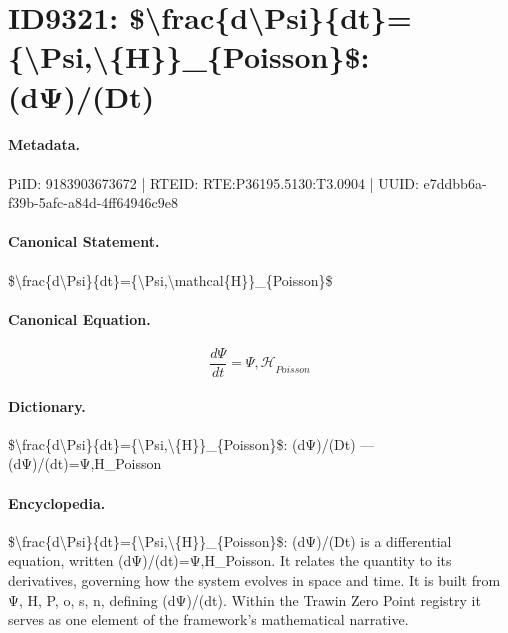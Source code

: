 \section*{ID9321: \$\textbackslash{}frac\{d\textbackslash{}Psi\}\{dt\}=\{\textbackslash{}Psi,\textbackslash{}\{H\}\}\_\{Poisson\}\$: (dΨ)/(Dt)}
\paragraph{Metadata.}
PiID: 9183903673672 | RTEID: RTE:P36195.5130:T3.0904 | UUID: e7ddbb6a-f39b-5afc-a84d-4ff64946c9e8

\paragraph{Canonical Statement.}
\$\textbackslash{}frac\{d\textbackslash{}Psi\}\{dt\}=\{\textbackslash{}Psi,\textbackslash{}mathcal\{H\}\}\_\{Poisson\}\$

\paragraph{Canonical Equation.}
\[
\frac{d\Psi}{dt}={\Psi,\mathcal{H}}_{Poisson}
\]

\paragraph{Dictionary.}
\$\textbackslash{}frac\{d\textbackslash{}Psi\}\{dt\}=\{\textbackslash{}Psi,\textbackslash{}\{H\}\}\_\{Poisson\}\$: (dΨ)/(Dt) — (dΨ)/(dt)=Ψ,H\_Poisson

\paragraph{Encyclopedia.}
\$\textbackslash{}frac\{d\textbackslash{}Psi\}\{dt\}=\{\textbackslash{}Psi,\textbackslash{}\{H\}\}\_\{Poisson\}\$: (dΨ)/(Dt) is a differential equation, written (dΨ)/(dt)=Ψ,H\_Poisson. It relates the quantity to its derivatives, governing how the system evolves in space and time. It is built from Ψ, H, P, o, s, n, defining (dΨ)/(dt). Within the Trawin Zero Point registry it serves as one element of the framework's mathematical narrative.
